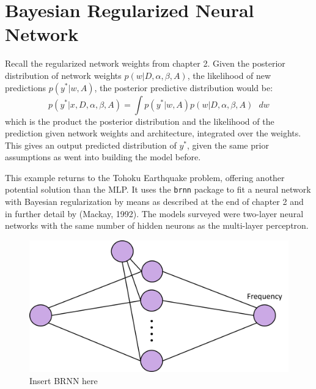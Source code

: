 \section{Bayesian Regularized Neural Network}

Recall the regularized network weights from chapter 2. Given the posterior distribution of network weights $p(w|D,\alpha,\beta,A)$, the likelihood of new predictions $p(y^*|w,A)$, the posterior predictive distribution would be:
$$
p(y^*|x,D,\alpha,\beta,A) = \int p(y^*|w,A) p(w|D,\alpha,\beta,A) \text{ } dw
$$
which is the product the posterior distribution and the likelihood of the prediction given network weights and architecture, integrated over the weights.  This gives an output predicted distribution of $y^*$, given the same prior assumptions as went into building the model before.

This example returns to the Tohoku Earthquake problem, offering another potential solution than the MLP.  It uses the \texttt{brnn} package \cite{brnn} to fit a neural network with Bayesian regularization by means as described at the end of chapter 2 and in further detail by (Mackay, 1992).
The models surveyed were two-layer neural networks with the same number of hidden neurons as the multi-layer perceptron.

\begin{figure}[H]
    \center
    \includegraphics[width=0.55\linewidth]{Figures/BRNNdiag.png}
    \caption{\footnotesize{Insert BRNN here}}
    \label{tohoku_unfit}
\end{figure}

